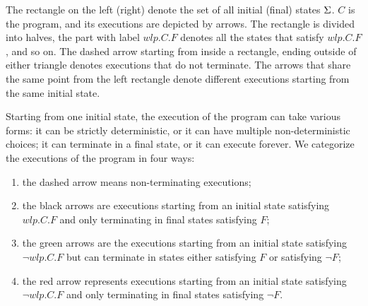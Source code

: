 The rectangle on the left (right) denote the set of all initial (final) states $\S$. 
$C$ is the program, and its executions are depicted by arrows. 
The rectangle is divided into halves, the part with label $wlp.C.F$ denotes all the states that satisfy $wlp.C.F$, and so on. 
The dashed arrow starting from inside a rectangle, ending outside of either triangle denotes executions that do not terminate. 
The arrows that share the same point from the left rectangle denote different executions starting from the same initial state. 

Starting from one initial state, the execution of the program can take various forms: it can be strictly deterministic, or it can have multiple non-deterministic choices; it can terminate in a final state, or it can execute forever. 
We categorize the executions of the program in four ways: 
\begin{enumerate}
	\item the dashed arrow means non-terminating executions; 
	\item the black arrows are executions starting from an initial state satisfying $wlp.C.F$ and only terminating in final states satisfying $F$; 
	\item the green arrows are the executions starting from an initial state satisfying $\neg wlp.C.F$ but can terminate in states either satisfying $F$ or satisfying $\neg F$;
	\item the red arrow represents executions starting from an initial state satisfying $\neg wlp.C.F$ and only terminating in final states satisfying $\neg F$. 
\end{enumerate}



